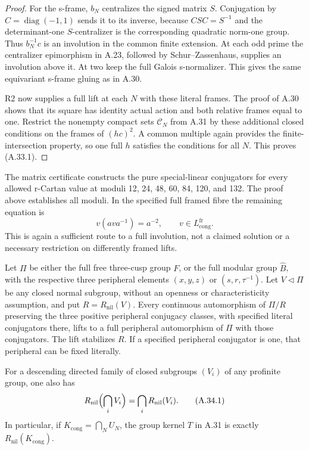 \begin{proof}
For the s-frame, \(b_N\) centralizes the signed
matrix \(S\). Conjugation by
\(C=\operatorname{diag}(-1,1)\) sends it to its
inverse, because \(CSC=S^{-1}\) and the
determinant-one \(S\)-centralizer is the
corresponding quadratic norm-one group.
Thus \(b_N^{-1}c\) is an involution in the
common finite extension. At each odd prime the
centralizer epimorphism in A.23, followed by
Schur--Zassenhaus, supplies an involution above
it. At two keep the full Galois s-normalizer.
This gives the same equivariant s-frame gluing
as in A.30.

R2 now supplies a full lift at each \(N\) with
these literal frames. The proof of A.30 shows
that its square has identity actual action and
both relative frames equal to one. Restrict
the nonempty compact sets \(\mathcal C_N\)
from A.31 by these additional closed conditions
on the frames of \((hc)^2\). A common multiple
again provides the finite-intersection property,
so one full \(h\) satisfies the conditions for
all \(N\). This proves (A.33.1).
\end{proof}

The matrix certificate
 constructs
the pure special-linear conjugators for every
allowed r-Cartan value at moduli
12, 24, 48, 60, 84, 120, and 132. The proof above
establishes all moduli. In the specified full
framed fibre the remaining equation is
\[
            v(ava^{-1})=a^{-2},
            \qquad v\in L_{\mathrm{cong}}^{\mathrm{fr}}.
\]
This is again a sufficient route to a full
involution, not a claimed solution or a necessary
restriction on differently framed lifts.

Let \(\Pi\) be either the full free three-cusp group
\(F\), or the full modular group \(\widehat B\), with
the respective three peripheral elements
\((x,y,z)\) or \((s,r,\tau^{-1})\).
Let \(V\triangleleft\Pi\) be any closed normal subgroup,
without an openness or characteristicity assumption,
and put \(R=R_{\mathrm{nil}}(V)\).
Every continuous automorphism of \(\Pi/R\) preserving
the three positive peripheral conjugacy classes, with
specified literal conjugators there, lifts to a full
peripheral automorphism of \(\Pi\) with those conjugators.
The lift stabilizes \(R\). If a specified peripheral
conjugator is one, that peripheral can be fixed literally.

For a descending directed family of closed subgroups
\((V_i)\) of any profinite group, one also has
\[
 R_{\mathrm{nil}}\Bigl(\bigcap_i V_i\Bigr)
                  =\bigcap_i R_{\mathrm{nil}}(V_i).
 \tag{A.34.1}
\]
In particular, if \(K_{\mathrm{cong}}=\bigcap_NU_N\),
the group kernel \(T\) in A.31 is exactly
\(R_{\mathrm{nil}}(K_{\mathrm{cong}})\).

